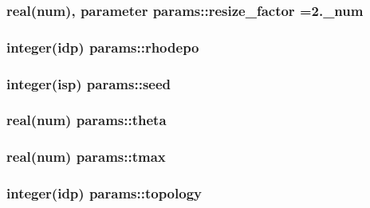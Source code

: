 \subsubsection[{\texorpdfstring{resize\+\_\+factor}{resize_factor}}]{\setlength{\rightskip}{0pt plus 5cm}real(num), parameter params\+::resize\+\_\+factor =2.\+\_\+num}\hypertarget{namespaceparams_a70195e670ef122bc4f91d74793b68621}{}\label{namespaceparams_a70195e670ef122bc4f91d74793b68621}
\subsubsection[{\texorpdfstring{rhodepo}{rhodepo}}]{\setlength{\rightskip}{0pt plus 5cm}integer(idp) params\+::rhodepo}\hypertarget{namespaceparams_ae892561d7462a1e54b9b6b2bbe1adc4c}{}\label{namespaceparams_ae892561d7462a1e54b9b6b2bbe1adc4c}
\subsubsection[{\texorpdfstring{seed}{seed}}]{\setlength{\rightskip}{0pt plus 5cm}integer(isp) params\+::seed}\hypertarget{namespaceparams_ae32095407c8380779cfc1562a62d15e3}{}\label{namespaceparams_ae32095407c8380779cfc1562a62d15e3}
\subsubsection[{\texorpdfstring{theta}{theta}}]{\setlength{\rightskip}{0pt plus 5cm}real(num) params\+::theta}\hypertarget{namespaceparams_ae4f22fd44655050055d203271b8b4025}{}\label{namespaceparams_ae4f22fd44655050055d203271b8b4025}
\subsubsection[{\texorpdfstring{tmax}{tmax}}]{\setlength{\rightskip}{0pt plus 5cm}real(num) params\+::tmax}\hypertarget{namespaceparams_afb32b5ca9f2ce80f08c5098d46a45750}{}\label{namespaceparams_afb32b5ca9f2ce80f08c5098d46a45750}
\subsubsection[{\texorpdfstring{topology}{topology}}]{\setlength{\rightskip}{0pt plus 5cm}integer(idp) params\+::topology}\hypertarget{namespaceparams_a259d1ed7155ef66db12c877a797fc0f0}{}\label{namespaceparams_a259d1ed7155ef66db12c877a797fc0f0}
